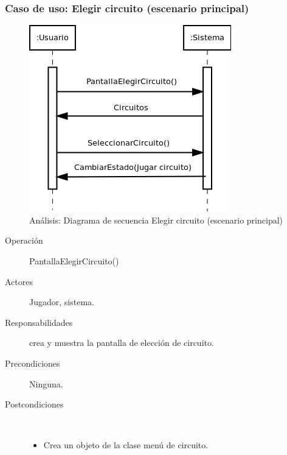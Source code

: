 \subsubsection{Caso de uso: Elegir circuito (escenario principal)}

\begin{figure}[H] 
  \label{secuencia_elegir_circuito}
  \begin{center}
    \includegraphics[scale=0.6]{imagenes/analisis/secuencia_elegir_circuito.png}
  \end{center}
  \caption{Análisis: Diagrama de secuencia Elegir circuito (escenario principal)}
\end{figure}

\begin{description}
    \item [Operación] PantallaElegirCircuito()
    \item [Actores] Jugador, sistema.
    \item [Responsabilidades] crea y muestra la pantalla de elección de circuito.
    \item [Precondiciones] Ninguna.
    \item [Postcondiciones] $\quad$
        \begin{itemize}
            \item Crea un objeto de la clase menú de circuito.
        \end{itemize}
\end{description}

